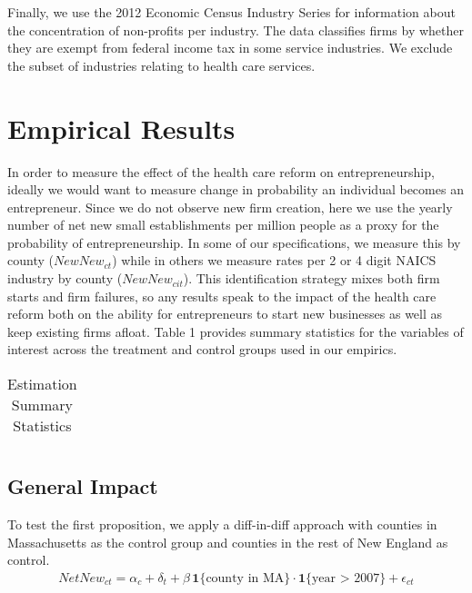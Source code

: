 \documentclass[12pt]{article}
\begin{document}
Finally, we use the 2012 Economic Census Industry Series for information about the concentration of non-profits per industry. The data classifies firms by whether they are exempt from federal income tax in some service industries. We exclude the subset of industries relating to health care services.

\section{Empirical Results}
In order to measure the effect of the health care reform on entrepreneurship, ideally we would want to measure change in probability an individual becomes an entrepreneur. Since we do not observe new firm creation, here we use the yearly number of net new small establishments per million people as a proxy for the probability of entrepreneurship. In some of our specifications, we measure this by county ($NewNew_{ct}$) while in others we measure rates per 2 or 4 digit NAICS industry by county ($NewNew_{cit}$). This identification strategy mixes both firm starts and firm failures, so any results speak to the impact of the health care reform both on the ability for entrepreneurs to start new businesses as well as keep existing firms afloat. Table 1 provides summary statistics for the variables of interest across the treatment and control groups used in our empirics. 
\begin{flushleft}
\begin{table}[H]
	\centering
	\begin{tabular}{|p{6cm} | r | r| r| r|r|}
	\hline
	
	\hline
	\end{tabular}
	\caption{Estimation Summary Statistics}
\end{table}
\end{flushleft}

\subsection{General Impact}

To test the first proposition, we apply a diff-in-diff approach with counties in Massachusetts as the control group and counties in the rest of New England as control.
\begin{align}
NetNew_{ct} = \alpha_c + \delta_t + \beta \, \mathbf{1}\{\text{county in MA}\} \cdot \mathbf{1}\{\text{year > 2007}\} + \epsilon_{ct}
\end{align}
\end{document}
